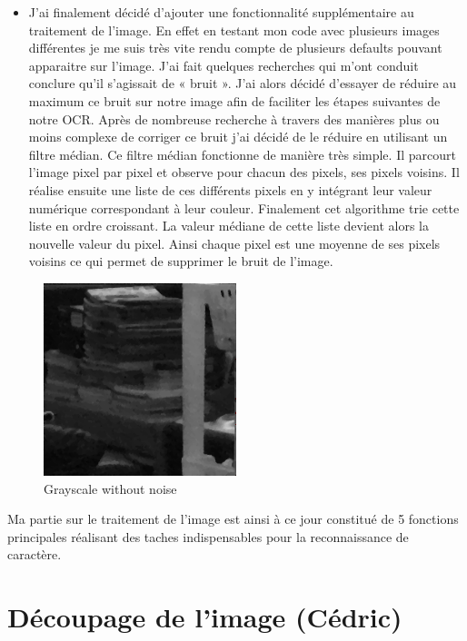 \documentclass[12pt]{report}
\begin{document}
\newpage
\begin{itemize}[label=\textbullet]
	\item J’ai finalement décidé d’ajouter une fonctionnalité supplémentaire au traitement de l’image. En effet en testant mon code avec plusieurs images différentes je me suis très vite rendu compte de plusieurs defaults pouvant apparaitre sur l’image. J’ai fait quelques recherches qui m’ont conduit conclure qu’il s’agissait de « bruit ». J’ai alors décidé d’essayer de réduire au maximum ce bruit sur notre image afin de faciliter les étapes suivantes de notre OCR. Après de nombreuse recherche à travers des manières plus ou moins complexe de corriger ce bruit j’ai décidé de le réduire en utilisant un filtre médian. Ce filtre médian fonctionne de manière très simple. Il parcourt l’image pixel par pixel et observe pour chacun des pixels, ses pixels voisins. Il réalise ensuite une liste de ces différents pixels en y intégrant leur valeur numérique correspondant à leur couleur. Finalement cet algorithme trie cette liste en ordre croissant. La valeur médiane de cette liste devient alors la nouvelle valeur du pixel. Ainsi chaque pixel est une moyenne de ses pixels voisins ce qui permet de supprimer le bruit de l’image. 
\end{itemize}
\begin{figure}[H]
    \centering
    \includegraphics[width=0.5\textwidth]{noiseless_grayscale}
    \caption{Grayscale without noise}
\end{figure}

Ma partie sur le traitement de l’image est ainsi à ce jour constitué de 5 fonctions principales réalisant des taches indispensables pour la reconnaissance de caractère. 

\section{Découpage de l'image (Cédric)}
\end{document}
